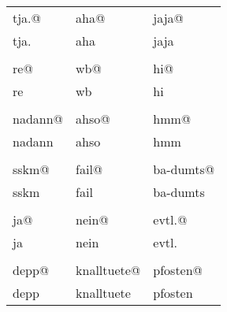 \documentclass[oneside,12pt,a4paper]{scrartcl}
\makeatletter
\newcommand{\barcode}[1]{{\xlix@#1@}}
\makeatother
\begin{document}
\begin{tabularx}{\textwidth}{m{5cm}m{5cm}m{5cm}}
  \barcode{tja.} & \barcode{aha} & \barcode{jaja} \\
   tja. & aha & jaja \\

\\
  \barcode{re} & \barcode{wb} & \barcode{hi} \\
   re & wb & hi \\

\\
  \barcode{nadann} & \barcode{ahso} & \barcode{hmm} \\
   nadann & ahso & hmm \\

\\
  \barcode{sskm} & \barcode{fail} & \barcode{ba-dumts} \\
   sskm & fail & ba-dumts \\

\\
  \barcode{ja} & \barcode{nein} & \barcode{evtl.} \\
   ja & nein & evtl. \\

\\
  \barcode{depp} & \barcode{knalltuete} & \barcode{pfosten} \\
   depp & knalltuete & pfosten \\
\end{tabularx}
\end{document}
